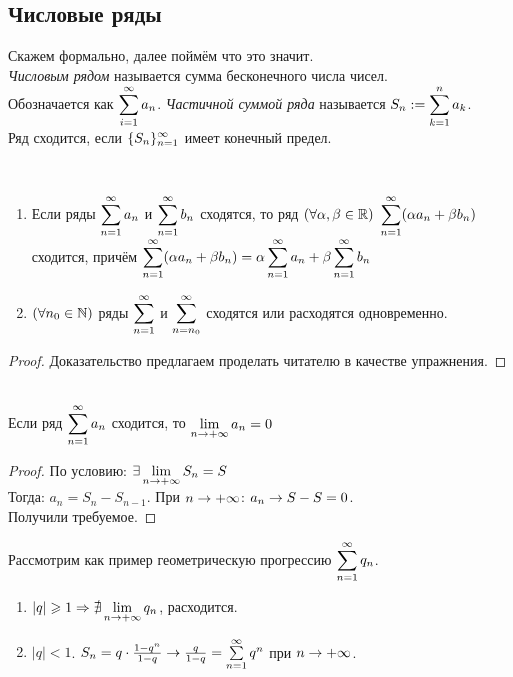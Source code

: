 \subsection{Числовые ряды}
\begin{definition}
	Скажем формально, далее поймём что это значит.\\
	\textit{Числовым рядом} называется сумма бесконечного числа чисел.\\ Обозначается как $\ds\sum_{i=1}^\infty a_n$. \textit{Частичной суммой ряда} называется $\ds S_n:=\sum_{k=1}^na_k$.\\
	Ряд сходится, если $\displaystyle\{S_n\}_{n=1}^\infty$ имеет конечный предел.
\end{definition}
\begin{lemma}\\
	\begin{enumerate}
		\item Если ряды $\ds\sum_{n=1}^\i a_n$ и $\ds\sum_{n=1}^\i b_n$ сходятся, то ряд $\ds(\fa\al,\beta\in\R)\ \sum_{n=1}^\i(\al a_n+\beta b_n)$ сходится, причём $\ds\sum_{n=1}^\i(\al a_n+\beta b_n)=\al\sum_{n=1}^\i a_n+\beta\sum_{n=1}^\i b_n$
		\item $(\forall n_0\in\mathbb{N})$ ряды $\ds\sum_{n=1}^\i$ и $\ds\sum_{n=n_0}^\i$ сходятся или расходятся одновременно.
	\end{enumerate}
\end{lemma}
\begin{proof}
	Доказательство предлагаем проделать читателю в качестве упражнения.
\end{proof}
\begin{theorem}\label{12_th1}\\
	Если ряд $\ds\sum_{n=1}^\i a_n$ сходится, то $\lim_{n\ra\p}a_n=0$
\end{theorem}
\begin{proof}
	По условию: $\ds\ex\lim_{n\ra\p}S_n=S$\\
	Тогда: $a_n=S_n-S_{n-1}$. При $n\rightarrow{+\infty}$: $a_n\rightarrow S-S=0$.\\
	Получили требуемое.
\end{proof}
\begin{example}
	Рассмотрим как пример геометрическую прогрессию $\ds\sum_{n=1}^\i q_n$.
	\begin{enumerate}
		\item $|q|\ge1\Ra\nexists\lim_{n\ra\p}q_n$, расходится.
		\item $|q|<1$. $S_n=q\cdot\frac{1-q^n}{1-q}\ra\frac q{1-q}=\sum_{n=1}^\i q^n$ при $n\rightarrow{+\infty}$.
	\end{enumerate}
\end{example}
